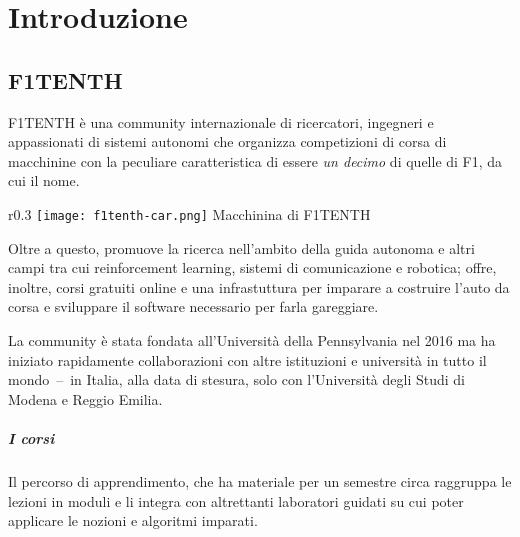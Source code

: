\chapter{Introduzione}

\section{F1TENTH}
F1TENTH è una community internazionale di ricercatori, ingegneri e appassionati di sistemi autonomi
che organizza competizioni di corsa di macchinine con la peculiare caratteristica
di essere \textit{un decimo} di quelle di F1, da cui il nome.
\begin{wrapfigure}{r}{0.3\textwidth}
	\centering
	\texttt{[image: f1tenth-car.png]}
	{\footnotesize Macchinina di F1TENTH}
\end{wrapfigure}
Oltre a questo, promuove la ricerca nell'ambito della guida autonoma
e altri campi tra cui reinforcement learning, sistemi di comunicazione e robotica;
offre, inoltre, corsi gratuiti online e una infrastuttura per imparare a costruire l'auto da corsa
e sviluppare il software necessario per farla gareggiare. %

La community è stata fondata all'Università della Pennsylvania nel 2016 ma ha iniziato rapidamente
collaborazioni con altre istituzioni e università in tutto il mondo~--~in Italia, alla data di stesura, solo
con l'Università degli Studi di Modena e Reggio Emilia.

\paragraph{I corsi}
Il percorso di apprendimento, che ha materiale per un semestre circa
raggruppa le lezioni in moduli e li integra con altrettanti laboratori guidati
su cui poter applicare le nozioni e algoritmi imparati.

